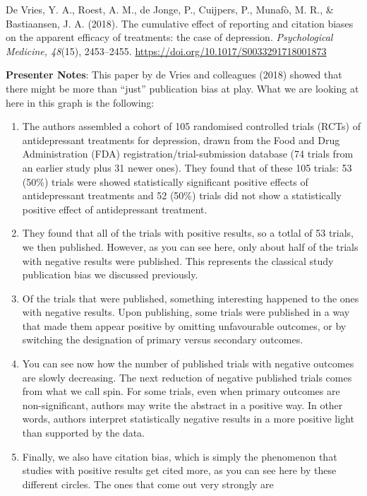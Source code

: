 \documentclass[
  letterpaper,
  DIV=11,
  numbers=noendperiod]{scrartcl}
\begin{document}
De Vries, Y. A., Roest, A. M., de Jonge, P., Cuijpers, P., Munafò, M.
R., \& Bastiaansen, J. A. (2018). The cumulative effect of reporting and
citation biases on the apparent efficacy of treatments: the case of
depression. \emph{Psychological Medicine, 48}(15), 2453--2455.
\url{https://doi.org/10.1017/S0033291718001873}

\textbf{Presenter Notes}: This paper by de Vries and colleagues (2018)
showed that there might be more than ``just'' publication bias at play.
What we are looking at here in this graph is the following:

\begin{enumerate}
\def\labelenumi{\alph{enumi})}
\item
  The authors assembled a cohort of 105 randomised controlled trials
  (RCTs) of antidepressant treatments for depression, drawn from the
  Food and Drug Administration (FDA) registration/trial-submission
  database (74 trials from an earlier study plus 31 newer ones). They
  found that of these 105 trials: 53 (50\%) trials were showed
  statistically significant positive effects of antidepressant
  treatments and 52 (50\%) trials did not show a statistically positive
  effect of antidepressant treatment.
\item
  They found that all of the trials with positive results, so a totlal
  of 53 trials, we then published. However, as you can see here, only
  about half of the trials with negative results were published. This
  represents the classical study publication bias we discussed
  previously.
\item
  Of the trials that were published, something interesting happened to
  the ones with negative results. Upon publishing, some trials were
  published in a way that made them appear positive by omitting
  unfavourable outcomes, or by switching the designation of primary
  versus secondary outcomes.
\item
  You can see now how the number of published trials with negative
  outcomes are slowly decreasing. The next reduction of negative
  published trials comes from what we call spin. For some trials, even
  when primary outcomes are non-significant, authors may write the
  abstract in a positive way. In other words, authors interpret
  statistically negative results in a more positive light than supported
  by the data.
\item
  Finally, we also have citation bias, which is simply the phenomenon
  that studies with positive results get cited more, as you can see here
  by these different circles. The ones that come out very strongly are

\end{enumerate}
\end{document}
